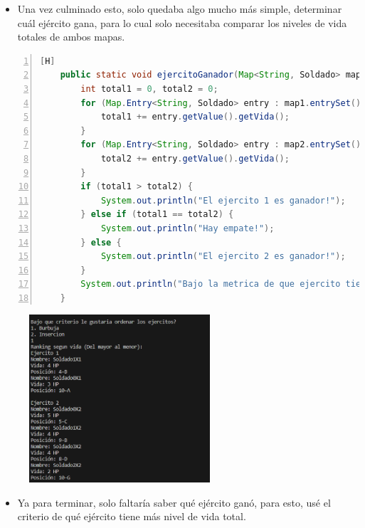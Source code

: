 \documentclass{article}
\begin{document}
	\begin{itemize}	
		\item Una vez culminado esto, solo quedaba algo mucho más simple, determinar cuál ejército gana, para lo cual solo necesitaba comparar los niveles de vida totales de ambos mapas.
		
	\end{itemize}
	\begin{lstlisting}[language=java,caption={Ejército ganador}, numbers=left][H]
	public static void ejercitoGanador(Map<String, Soldado> map1, Map<String, Soldado> map2) {
        int total1 = 0, total2 = 0;
        for (Map.Entry<String, Soldado> entry : map1.entrySet()) {
            total1 += entry.getValue().getVida();
        }
        for (Map.Entry<String, Soldado> entry : map2.entrySet()) {
            total2 += entry.getValue().getVida();
        }
        if (total1 > total2) {
            System.out.println("El ejercito 1 es ganador!");
        } else if (total1 == total2) {
            System.out.println("Hay empate!");
        } else {
            System.out.println("El ejercito 2 es ganador!");
        }
        System.out.println("Bajo la metrica de que ejercito tiene mas vida");
    }
    \end{lstlisting}
	\begin{figure}[H]
		\centering
	\includegraphics[width=0.6\textwidth,keepaspectratio]{img/captura5.png}
	\end{figure}
	
	\begin{itemize}	
		\item Ya para terminar, solo faltaría saber qué ejército ganó, para esto, usé el criterio de qué ejército tiene más nivel de vida total.
	\end{itemize}
	
\end{document}
